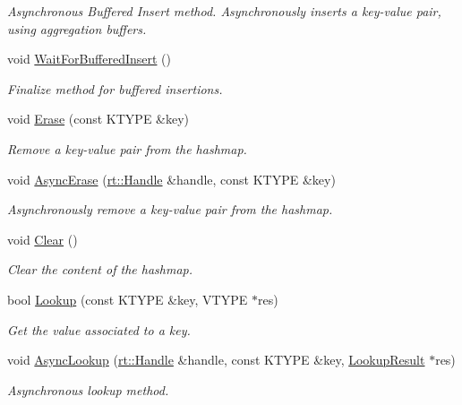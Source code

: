 \begin{DoxyCompactItemize}
\begin{DoxyCompactList}\small\item\em Asynchronous Buffered Insert method. Asynchronously inserts a key-\/value pair, using aggregation buffers. \end{DoxyCompactList}\item 
void \hyperlink{classshad_1_1Hashmap_a002531ab15c552400f95ec80029d4eed}{Wait\-For\-Buffered\-Insert} ()
\begin{DoxyCompactList}\small\item\em Finalize method for buffered insertions. \end{DoxyCompactList}\item 
void \hyperlink{classshad_1_1Hashmap_ad93d311ba86a6a7d80120f67d846dbd5}{Erase} (const K\-T\-Y\-P\-E \&key)
\begin{DoxyCompactList}\small\item\em Remove a key-\/value pair from the hashmap. \end{DoxyCompactList}\item 
void \hyperlink{classshad_1_1Hashmap_aff16ee975fc59681c4ce7e9ae79b4125}{Async\-Erase} (\hyperlink{classshad_1_1rt_1_1Handle}{rt\-::\-Handle} \&handle, const K\-T\-Y\-P\-E \&key)
\begin{DoxyCompactList}\small\item\em Asynchronously remove a key-\/value pair from the hashmap. \end{DoxyCompactList}\item 
void \hyperlink{classshad_1_1Hashmap_a708b4f1033b3119ed2cc2afd0d469341}{Clear} ()
\begin{DoxyCompactList}\small\item\em Clear the content of the hashmap. \end{DoxyCompactList}\item 
bool \hyperlink{classshad_1_1Hashmap_a86cce815ed1c4854c36958611cc32377}{Lookup} (const K\-T\-Y\-P\-E \&key, V\-T\-Y\-P\-E $\ast$res)
\begin{DoxyCompactList}\small\item\em Get the value associated to a key. \end{DoxyCompactList}\item 
void \hyperlink{classshad_1_1Hashmap_aeca796c945726ce7ab4b67e1add6bb1f}{Async\-Lookup} (\hyperlink{classshad_1_1rt_1_1Handle}{rt\-::\-Handle} \&handle, const K\-T\-Y\-P\-E \&key, \hyperlink{classshad_1_1Hashmap_acc8ac68502c6c886d18d660e907fef0a}{Lookup\-Result} $\ast$res)
\begin{DoxyCompactList}\small\item\em Asynchronous lookup method. \end{DoxyCompactList}\item 

\end{DoxyCompactItemize}
